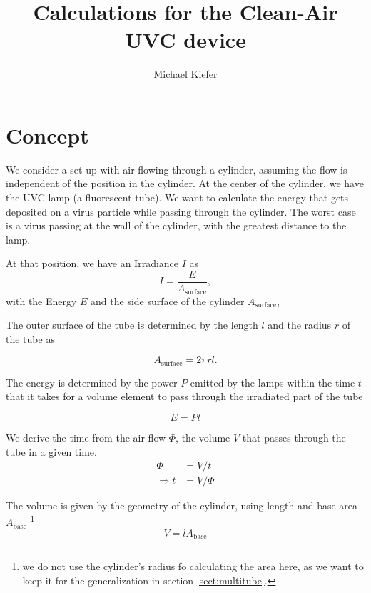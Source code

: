 \documentclass[12pt]{scrartcl}
\author{Michael Kiefer}\publishers{MaibornWolff GmbH, Versmannstr. 2, 20457 Hamburg}
\title{Calculations for the Clean-Air UVC device}
\begin{document}
\maketitle{}

\section{Concept}
We consider a set-up with air flowing through a cylinder, assuming the flow is independent of the position in the cylinder. At the center of the cylinder, we have the UVC lamp (a fluorescent tube). 
We want to calculate the energy that gets deposited on a virus particle while passing through the cylinder. The worst case is a virus passing at the wall of the cylinder, with the greatest distance to the lamp.

At that position, we have an Irradiance $I$ as
\begin{equation}
I   = \frac{E}{A_{\text{surface}}},  \label{eqn:irradiance}
\end{equation}
with the Energy $E$ and the side surface of the cylinder $A_{\text{surface}}$,

The outer surface of the tube is determined by the length $l$ and the radius $r$ of the tube as

\begin{equation}
A_{\text{surface}} = 2\pi r l.  \label{eqn:surface}
\end{equation}

The energy is determined by the power $P$ emitted by the lamps within the time $t$ that it takes for a volume element to pass through the irradiated part of the tube

\begin{equation}
E = P  t  \label{eqn:energy}
\end{equation}

We derive the time from the air flow $\Phi$, the volume $V$ that passes through the tube in a given time.
\begin{align}
\Phi &= V / t\\
\Rightarrow t &=V / \Phi
\end{align}

The volume is given by the geometry of the cylinder, using length and base area $A_{\text{base}}$
\footnote{we do not use the cylinder's radius fo calculating the area here, as we want to keep it for the generalization in section \ref{sect:multitube}.}
\begin{equation}
V = l A_{\text{base}} \label{eqn:volume}
\end{equation}
\end{document}

